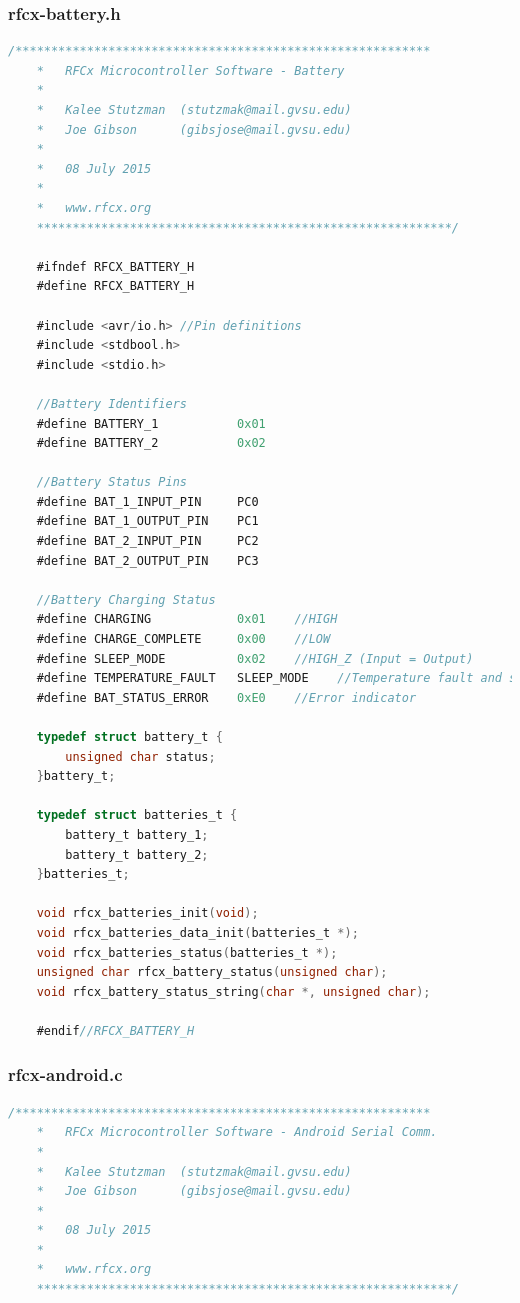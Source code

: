 \documentclass{article}
\numberwithin{figure}{section}
\numberwithin{equation}{section}
\begin{document}
{\subsubsection{rfcx-battery.h}\label{sect:rfcx-battery.h}
\begin{lstlisting}[language=C,label=lst:rfcx-battery.h,caption=rfcx-battery.h]
    /**********************************************************
    *	RFCx Microcontroller Software - Battery
    *
    *	Kalee Stutzman 	(stutzmak@mail.gvsu.edu)
    *	Joe Gibson		(gibsjose@mail.gvsu.edu)
    *
    *	08 July 2015
    *
    *   www.rfcx.org
    **********************************************************/

    #ifndef RFCX_BATTERY_H
    #define RFCX_BATTERY_H

    #include <avr/io.h> //Pin definitions
    #include <stdbool.h>
    #include <stdio.h>

    //Battery Identifiers
    #define BATTERY_1           0x01
    #define BATTERY_2           0x02

    //Battery Status Pins
    #define BAT_1_INPUT_PIN     PC0
    #define BAT_1_OUTPUT_PIN    PC1
    #define BAT_2_INPUT_PIN     PC2
    #define BAT_2_OUTPUT_PIN    PC3

    //Battery Charging Status
    #define CHARGING            0x01    //HIGH
    #define CHARGE_COMPLETE     0x00    //LOW
    #define SLEEP_MODE          0x02    //HIGH_Z (Input = Output)
    #define TEMPERATURE_FAULT   SLEEP_MODE    //Temperature fault and sleep mode share the same value for some reason...
    #define BAT_STATUS_ERROR    0xE0    //Error indicator

    typedef struct battery_t {
        unsigned char status;
    }battery_t;

    typedef struct batteries_t {
        battery_t battery_1;
        battery_t battery_2;
    }batteries_t;

    void rfcx_batteries_init(void);
    void rfcx_batteries_data_init(batteries_t *);
    void rfcx_batteries_status(batteries_t *);
    unsigned char rfcx_battery_status(unsigned char);
    void rfcx_battery_status_string(char *, unsigned char);

    #endif//RFCX_BATTERY_H
\end{lstlisting}

\subsubsection{rfcx-android.c}\label{sect:rfcx-android.c}
\begin{lstlisting}[language=C,label=lst:rfcx-android.c,caption=rfcx-android.c]
    /**********************************************************
    *	RFCx Microcontroller Software - Android Serial Comm.
    *
    *	Kalee Stutzman 	(stutzmak@mail.gvsu.edu)
    *	Joe Gibson		(gibsjose@mail.gvsu.edu)
    *
    *	08 July 2015
    *
    *   www.rfcx.org
    **********************************************************/


\end{lstlisting}}
\end{document}
